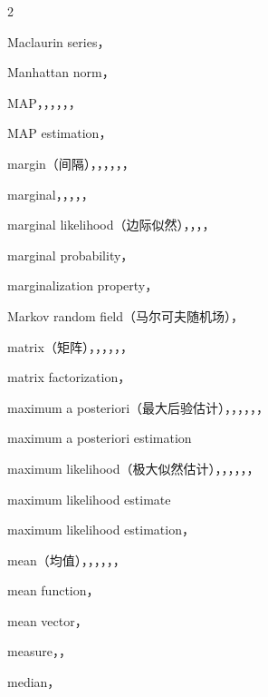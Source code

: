 \begin{multicols}{2}
\medskip{}\par\smallskip
\noindent Maclaurin series，\par
\noindent Manhattan norm，\par
\noindent MAP，，，，，，\par
\noindent MAP estimation，\par
\noindent margin（间隔），，，，，，\par
\noindent marginal，，，，，\par
\noindent marginal likelihood（边际似然），，，，\par
\noindent marginal probability，\par
\noindent marginalization property，\par
\noindent Markov random field（马尔可夫随机场），\par
\noindent matrix（矩阵），，，，，，\par
\noindent matrix factorization，\par
\noindent maximum a posteriori（最大后验估计），，，，，，\par
\noindent maximum a posteriori estimation\par
\noindent maximum likelihood（极大似然估计），，，，，，\par
\noindent maximum likelihood estimate\par
\noindent maximum likelihood estimation，\par
\noindent mean（均值），，，，，，\par
\noindent mean function，\par
\noindent mean vector，\par
\noindent measure，，\par
\noindent median，\par

\end{multicols}
